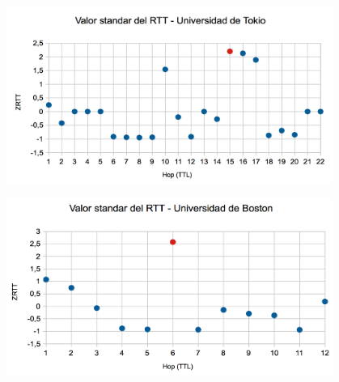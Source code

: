 \centerline{\includegraphics[width=0.8\textwidth]{imagenes/1ra_parte/Japon_3ergrafico.png}}

\centerline{\includegraphics[width=0.8\textwidth]{imagenes/1ra_parte/EEUU_3ergrafico.png}}

